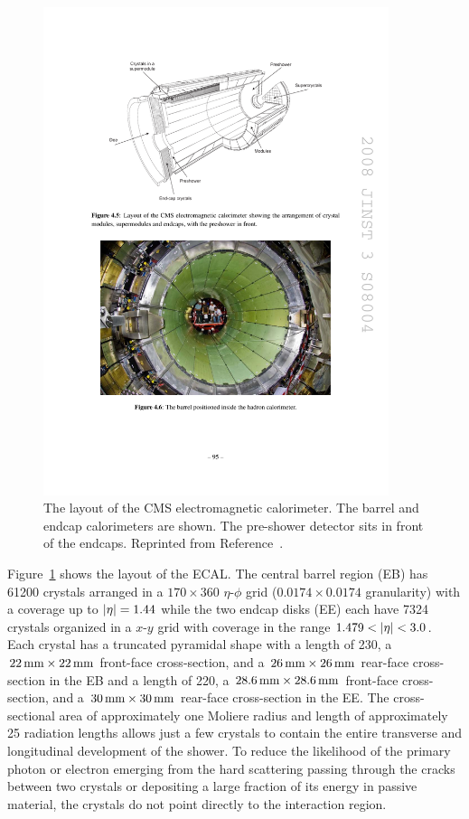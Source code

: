 \begin{figure}[htbp]
  \centering
  \includegraphics[width=0.9\textwidth]{Detector/Figures/cms_ecal.pdf}
  \caption{
    The layout of the CMS electromagnetic calorimeter.
    The barrel and endcap calorimeters are shown.
    The pre-shower detector sits in front of the endcaps.
    Reprinted from Reference~\cite{CMS2008}.
  }
  \label{fig:cms_ecal}
\end{figure}

Figure~\ref{fig:cms_ecal} shows the layout of the ECAL.
The central barrel region (EB) has 61200 crystals arranged in a $170\times360$ $\eta$-$\phi$ grid ($0.0174\times0.0174$ granularity) with a coverage up to $\lvert \eta \rvert = 1.44$ while the two endcap disks (EE) each have 7324 crystals organized in a $x$-$y$ grid with coverage in the range $1.479 < \lvert \eta \rvert < 3.0$.
Each crystal has a truncated pyramidal shape with a length of 230\mm, a $22\,\text{mm} \times 22\,\text{mm}$ front-face cross-section, and a $26\,\text{mm} \times 26\,\text{mm}$ rear-face cross-section in the EB and a length of 220\mm, a $28.6 \,\text{mm} \times 28.6\,\text{mm}$ front-face cross-section, and a $30\,\text{mm} \times 30\,\text{mm}$ rear-face cross-section in the EE.
The cross-sectional area of approximately one Moliere radius and length of approximately 25 radiation lengths allows just a few crystals to contain the entire transverse and longitudinal development of the shower.
To reduce the likelihood of the primary photon or electron emerging from the hard scattering passing through the cracks between two crystals or depositing a large fraction of its energy in passive material, the crystals do not point directly to the interaction region.

